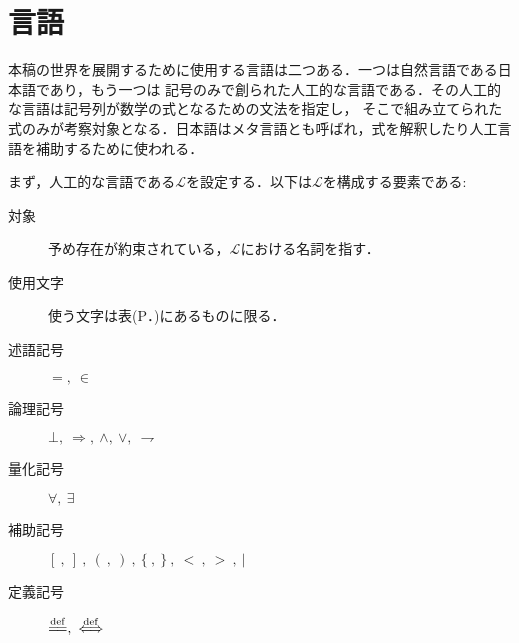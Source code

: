 	\begin{comment}
	\begin{quote}
		初めに言(ことば)があった。言は神と共にあった。言は神であった。\\
		この言は、初めに神と共にあった。\\
		万物は言によって成った。成ったもので、言によらずに成ったものは何一つなかった。
	\end{quote}
	ヨハネによる福音書の冒頭である．数学の世界もまたことばが支配する．
	ただし数学の世界におけることばには二つの階層がある．一つは記号や記号の並べ方を規定する下位のことばであり，
	もう一つは何が定理であるかを規定する上位のことばである．
	前者は我々が神の視点で創る世界のことばであり，後者は神である我々の世界のことばであるが，
	後者は論理と言い換える方が適当である．
	我々が創る世界は集合論と呼ばれ，数や関数など高校まで初等的に与えられてきたあらゆる概念がその世界の中で説明し直されることになる．
	我々が論理的思考を持っていたり自然にものを数えたり出来るのは，この世が神なる数学者によって創られたからであると信じて，
	本稿ではそういった生来の直感の一切合切を排して更地に立って数学を組み立てる．
	それは我々の我々による我々のための数学の世界である．つまり我々は本稿の神たる者となる．
	
	\end{comment}
	
\section{言語}
	本稿の世界を展開するために使用する言語は二つある．一つは自然言語である日本語であり，もう一つは
	記号のみで創られた人工的な言語である．その人工的な言語は記号列が数学の式となるための文法を指定し，
	そこで組み立てられた式のみが考察対象となる．日本語はメタ言語とも呼ばれ，式を解釈したり人工言語を補助するために使われる．
	
	まず，人工的な言語である$\mathcal{L}$を設定する．以下は$\mathcal{L}$を構成する要素である:
	\begin{description}
		\item[対象] 予め存在が約束されている，$\mathcal{L}$における名詞を指す． 
		\item[使用文字] 使う文字は表(P．\pageref{tab:alphabet})にあるものに限る．
		\item[述語記号] $=,\ \in$
		\item[論理記号] $\bot,\ \Longrightarrow,\ \wedge,\ \vee,\ \rightharpoondown$
		\item[量化記号] $\forall,\ \exists$
		\item[補助記号] $[\ ,\ ]\ ,\ (\ ,\ )\ ,\ \{\ ,\ \}\ ,\ <\ ,\ >\ ,\ |$
		\item[定義記号] $\defeq,\ \defarrow$
	\end{description}
	
